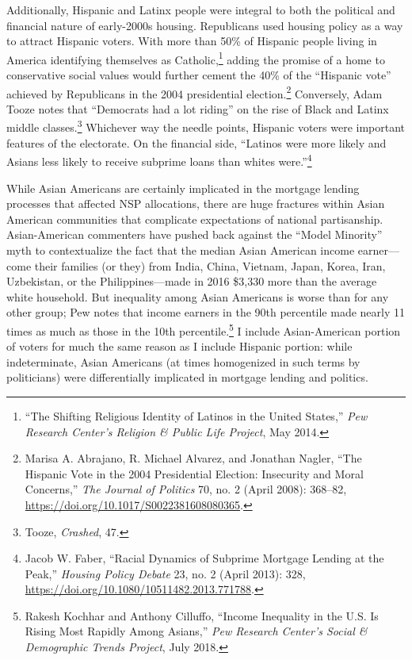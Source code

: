 \documentclass[12pt,oneside]{psthesis}
\begin{document}
Additionally, Hispanic and Latinx people were integral to both the political and financial nature of early-2000s housing.
Republicans used housing policy as a way to attract Hispanic voters.
With more than 50\% of Hispanic people living in America identifying themselves as Catholic,\footnote{``The Shifting Religious Identity of Latinos in the United States,'' \emph{Pew Research Center's Religion \& Public Life Project}, May 2014.} adding the promise of a home to conservative social values would further cement the 40\% of the ``Hispanic vote'' achieved by Republicans in the 2004 presidential election.\footnote{Marisa A. Abrajano, R. Michael Alvarez, and Jonathan Nagler, ``The Hispanic Vote in the 2004 Presidential Election: Insecurity and Moral Concerns,'' \emph{The Journal of Politics} 70, no. 2 (April 2008): 368--82, \url{https://doi.org/10.1017/S0022381608080365}.}
Conversely, Adam Tooze notes that ``Democrats had a lot riding'' on the rise of Black and Latinx middle classes.\footnote{Tooze, \emph{Crashed}, 47.}
Whichever way the needle points, Hispanic voters were important features of the electorate.
On the financial side, ``Latinos were more likely and Asians less likely to receive subprime loans than whites were.''\footnote{Jacob W. Faber, ``Racial Dynamics of Subprime Mortgage Lending at the Peak,'' \emph{Housing Policy Debate} 23, no. 2 (April 2013): 328, \url{https://doi.org/10.1080/10511482.2013.771788}.}

While Asian Americans are certainly implicated in the mortgage lending processes that affected NSP allocations, there are huge fractures within Asian American communities that complicate expectations of national partisanship.
Asian-American commenters have pushed back against the ``Model Minority'' myth to contextualize the fact that the median Asian American income earner---come their families (or they) from India, China, Vietnam, Japan, Korea, Iran, Uzbekistan, or the Philippines---made in 2016 \$3,330 more than the average white household.
But inequality among Asian Americans is worse than for any other group; Pew notes that income earners in the 90th percentile made nearly 11 times as much as those in the 10th percentile.\footnote{Rakesh Kochhar and Anthony Cilluffo, ``Income Inequality in the U.S. Is Rising Most Rapidly Among Asians,'' \emph{Pew Research Center's Social \& Demographic Trends Project}, July 2018.}
I include Asian-American portion of voters for much the same reason as I include Hispanic portion: while indeterminate, Asian Americans (at times homogenized in such terms by politicians) were differentially implicated in mortgage lending and politics.
\end{document}

